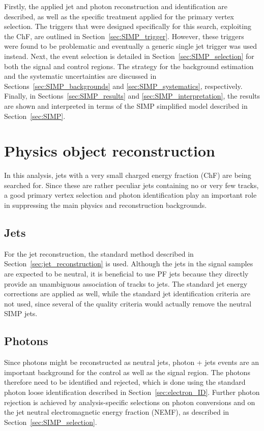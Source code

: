 Firstly, the applied jet and photon reconstruction and identification are described, as well as the specific treatment applied for the primary vertex selection. The triggers that were designed specifically for this search, exploiting the ChF, are outlined in Section~\ref{sec:SIMP_trigger}. However, these triggers were found to be problematic and eventually a generic single jet trigger was used instead. Next, the event selection is detailed in Section~\ref{sec:SIMP_selection} for both the signal and control regions. The strategy for the background estimation and the systematic uncertainties are discussed in Sections~\ref{sec:SIMP_backgrounds} and \ref{sec:SIMP_systematics}, respectively. Finally,  in Sections~\ref{sec:SIMP_results} and \ref{sec:SIMP_interpretation}, the results are shown and interpreted in terms of the \ac{SIMP} simplified model described in Section~\ref{sec:SIMP}.

\section{Physics object reconstruction} 
\label{sec:SIMP_reconstruction}

In this analysis, jets with a very small charged energy fraction (ChF) are being searched for. Since these are rather peculiar jets containing no or very few tracks, a good primary vertex selection and photon identification play an important role in suppressing the main physics and reconstruction backgrounds.

\subsection{Jets}

For the jet reconstruction, the standard method described in Section~\ref{sec:jet_reconstruction} is used. Although the jets in the signal samples are expected to be neutral, it is beneficial to use \ac{PF} jets because they directly provide an unambiguous association of tracks to jets. The standard jet energy corrections are applied as well, while the standard jet identification criteria are not used, since several of the quality criteria would actually remove the neutral \ac{SIMP} jets.

\subsection{Photons}

Since photons might be reconstructed as neutral jets, photon + jets events are an important background for the control as well as the signal region. The photons therefore need to be identified and rejected, which is done using the standard photon loose identification described in Section~\ref{sec:electron_ID}. Further photon rejection is achieved by analysis-specific selections on photon conversions and on the jet neutral electromagnetic energy fraction (NEMF), as described in Section~\ref{sec:SIMP_selection}.


